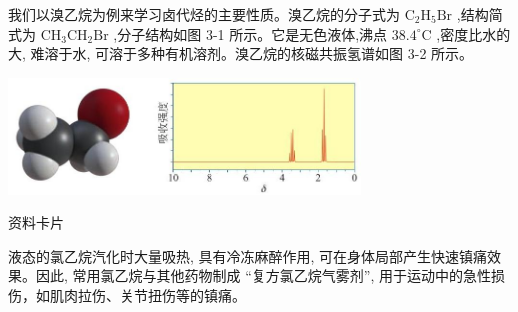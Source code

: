 \documentclass[10pt]{article}
\begin{document}
\begin{center}
\end{center}

我们以溴乙烷为例来学习卤代烃的主要性质。溴乙烷的分子式为 \({\mathrm{C}}_{2}{\mathrm{H}}_{5}\mathrm{{Br}}\) ,结构简式为 \({\mathrm{{CH}}}_{3}{\mathrm{{CH}}}_{2}\mathrm{{Br}}\) ,分子结构如图 3-1 所示。它是无色液体,沸点 \({38.4}^{ \circ }\mathrm{C}\) ,密度比水的大, 难溶于水, 可溶于多种有机溶剂。溴乙烷的核磁共振氢谱如图 3-2 所示。

\begin{center}
\includegraphics[max width=0.7\textwidth]{images/0190efc5-b58a-7c43-bfb0-e0a030df9cfd_60_426273.jpg}
\end{center}

\begin{mdframed}

资料卡片

液态的氯乙烷汽化时大量吸热, 具有冷冻麻醉作用, 可在身体局部产生快速镇痛效果。因此, 常用氯乙烷与其他药物制成 “复方氯乙烷气雾剂”, 用于运动中的急性损伤，如肌肉拉伤、关节扭伤等的镇痛。

\end{mdframed}
\end{document}
